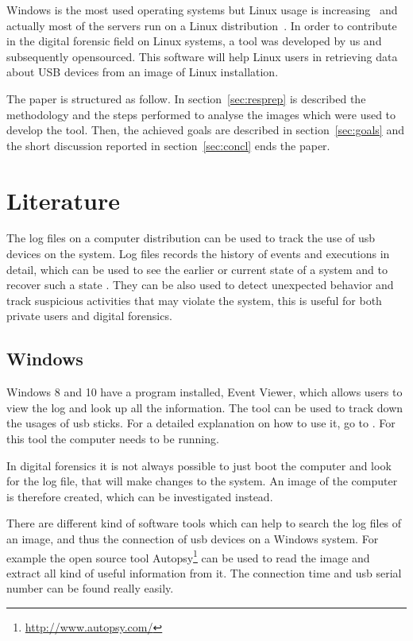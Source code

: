 \documentclass[a4paper]{article}
\begin{document}
Windows is the most used operating systems but Linux usage is
increasing~\cite{osShare} and actually most of the servers run on a Linux
distribution~\cite{InternetServer}. In order to contribute in the digital
forensic field on Linux systems, a tool was developed by us and subsequently
opensourced. This software will help Linux users in retrieving data about USB
devices from an image of Linux installation.

The paper is structured as follow. In section~\ref{sec:resprep} is described the
methodology and the steps performed to analyse the images which were used to
develop the tool. Then, the achieved goals are described in
section~\ref{sec:goals} and the short discussion reported in
section~\ref{sec:concl} ends the paper.

\section{Literature}\label{sec:lit}
The log files on a computer distribution can be used to track the use of usb
devices on the system.  Log files records the history of events and executions
in detail, which can be used to see the earlier or current state of a system and
to recover such a state \cite{logFiles}. They can be also used to detect
unexpected behavior and track suspicious activities that may violate the system,
this is useful for both private users and digital forensics.

\subsection{Windows}\label{sec:litWindows}
Windows 8 and 10 have a program installed, Event Viewer, which allows users to
view the log and look up all the information. The tool can be used to track down
the usages of usb sticks. For a detailed explanation on how to use it, go to
\cite{eventViewerW10}. For this tool the computer needs to be running.

In digital forensics it is not always possible to just boot the computer and
look for the log file, that will make changes to the system. An image of the
computer is therefore created, which can be investigated instead.

There are different kind of software tools which can help to search the log
files of an image, and thus the connection of usb devices on a Windows system.
For example the open source tool Autopsy\footnote{\url{http://www.autopsy.com/}}
can be used to read the image and extract all kind of useful information from
it. The connection time and usb serial number can be found really easily.
\end{document}
